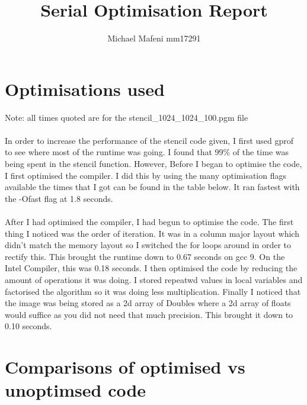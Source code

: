 \documentclass{article}
\title{Serial Optimisation Report}
\author{Michael Mafeni mm17291}
\begin{document}
    \maketitle
    \newpage
    \section{Optimisations used}
        Note: all times quoted are for the stencil_1024_1024_100.pgm file
        \paragraph{}

        In order to increase the performance of the stencil code given, I first used gprof to see where most of the runtime was going. I found that 99\% of the time was being spent in the stencil function. However, Before I began to optimise the code, I first optimised the compiler. I did this by using the many optimisation flags available the times that I got can be found in the table below. It ran fastest with the -Ofast flag at 1.8 seconds.
        \paragraph{}
        After I had optimised the compiler, I had begun to optimise the code. The first thing I noticed was the order of iteration. It was in a column major layout which didn't match the memory layout so I switched the for loops around in order to rectify this. This brought the runtime down to 0.67 seconds on gcc 9. On the Intel Compiler, this was 0.18 seconds. I then optimised the code by reducing the amount of operations it was doing. I stored repeatwd values in local variables and factorised the algorithm so it was doing less multiplication. Finally I noticed that the image was being stored as a 2d array of Doubles where a 2d array of floats would suffice as you did not need that much precision. This brought it down to 0.10 seconds.
    \section{Comparisons of optimised vs unoptimsed code}
\nocite{*}


\end{document}
